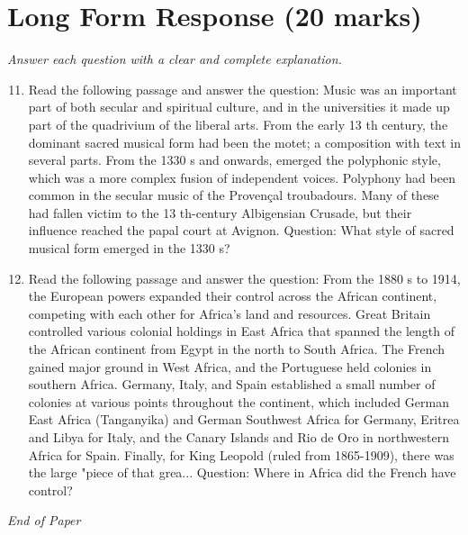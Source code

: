 \documentclass[12pt]{article}
\begin{document}
\section*{Long Form Response (20 marks)}
\textit{Answer each question with a clear and complete explanation.}
\begin{enumerate}[label=\arabic*.]
\setcounter{enumi}{10}
\item Read the following passage and answer the question: Music was an important part of both secular and spiritual culture, and in the universities it made up part of the quadrivium of the liberal arts. From the early 13 th century, the dominant sacred musical form had been the motet; a composition with text in several parts. From the 1330 s and onwards, emerged the polyphonic style, which was a more complex fusion of independent voices. Polyphony had been common in the secular music of the Provençal troubadours. Many of these had fallen victim to the 13 th-century Albigensian Crusade, but their influence reached the papal court at Avignon. Question: What style of sacred musical form emerged in the 1330 s?
\item Read the following passage and answer the question: From the 1880 s to 1914, the European powers expanded their control across the African continent, competing with each other for Africa's land and resources. Great Britain controlled various colonial holdings in East Africa that spanned the length of the African continent from Egypt in the north to South Africa. The French gained major ground in West Africa, and the Portuguese held colonies in southern Africa. Germany, Italy, and Spain established a small number of colonies at various points throughout the continent, which included German East Africa (Tanganyika) and German Southwest Africa for Germany, Eritrea and Libya for Italy, and the Canary Islands and Rio de Oro in northwestern Africa for Spain. Finally, for King Leopold (ruled from 1865-1909), there was the large "piece of that grea... Question: Where in Africa did the French have control?
\end{enumerate}

\vfill
\noindent\textit{End of Paper}
\end{document}

